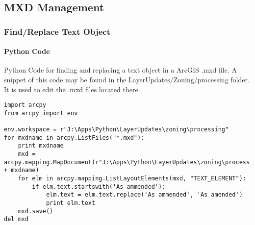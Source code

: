 \documentclass[class=article , crop=false, titlepage, twoside, multi={itemize, figure, verbatim}, float=false]{standalone}
\title{}  %
\begin{document}


\ifstandalone
\maketitle %
\tableofcontents %
\clearpage
\fi

\subsection{MXD Management}
\medskip
\subsubsection[Find/Replace Text Object]{\Large Find/Replace Text Object}


\paragraph{Python Code \texorpdfstring{\\}{}}
Python Code for finding and replacing a text object in a ArcGIS .mxd file.
A snippet of this code may be found in the LayerUpdates/Zoning/processing folder.
It is used to edit the .mxd files located there.

\begin{verbatim}
import arcpy
from arcpy import env

env.workspace = r"J:\Apps\Python\LayerUpdates\zoning\processing"
for mxdname in arcpy.ListFiles("*.mxd"):
    print mxdname
    mxd = arcpy.mapping.MapDocument(r"J:\Apps\Python\LayerUpdates\zoning\processing\\" + mxdname)
    for elm in arcpy.mapping.ListLayoutElements(mxd, "TEXT_ELEMENT"):
        if elm.text.startswith('As ammended'):
            elm.text = elm.text.replace('As ammended', 'As amended')
            print elm.text
    mxd.save()
del mxd
 \end{verbatim}
\end{document}
